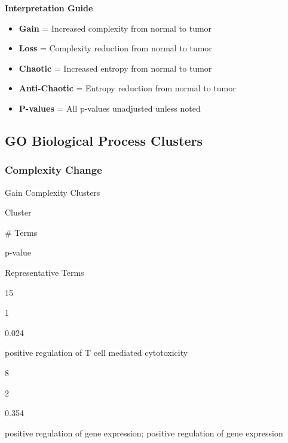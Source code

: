 \documentclass[
  letterpaper,
  DIV=11,
  numbers=noendperiod,
  openany,
  oneside]{scrreprt}
\providecommand{\tightlist}{%
  \setlength{\itemsep}{0pt}\setlength{\parskip}{0pt}}
\begin{document}
\begin{tcolorbox}[enhanced jigsaw, opacityback=0, colframe=quarto-callout-note-color-frame, toptitle=1mm, colback=white, breakable, toprule=.15mm, bottomrule=.15mm, opacitybacktitle=0.6, title=\textcolor{quarto-callout-note-color}{\faInfo}\hspace{0.5em}{Note}, coltitle=black, rightrule=.15mm, leftrule=.75mm, left=2mm, bottomtitle=1mm, titlerule=0mm, colbacktitle=quarto-callout-note-color!10!white, arc=.35mm]

\textbf{Interpretation Guide}

\begin{itemize}
\tightlist
\item
  \textbf{Gain} = Increased complexity from normal to tumor
\item
  \textbf{Loss} = Complexity reduction from normal to tumor
\item
  \textbf{Chaotic} = Increased entropy from normal to tumor
\item
  \textbf{Anti-Chaotic} = Entropy reduction from normal to tumor
\item
  \textbf{P-values} = All p-values unadjusted unless noted
\end{itemize}

\end{tcolorbox}

\subsection{GO Biological Process Clusters}

\subsubsection{Complexity Change}

Gain Complexity Clusters

Cluster

\# Terms

p-value

Representative Terms

15

1

0.024

positive regulation of T cell mediated cytotoxicity

8

2

0.354

positive regulation of gene expression; positive regulation of gene
expression
\end{document}
